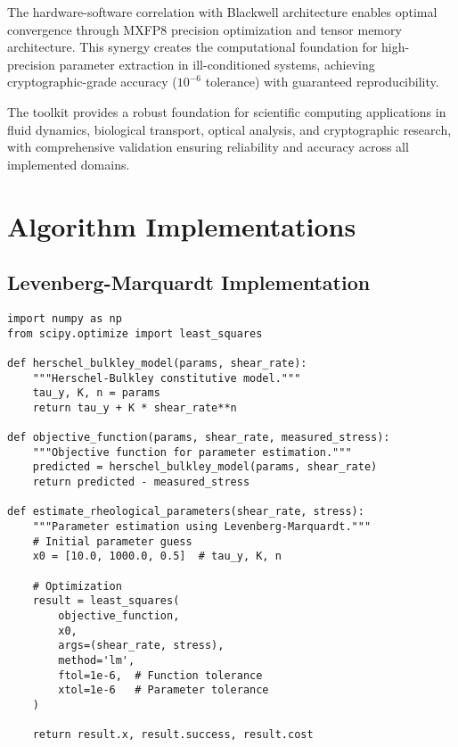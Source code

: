 \documentclass[11pt,a4paper]{article}
\begin{document}
The hardware-software correlation with Blackwell architecture enables optimal convergence through MXFP8 precision optimization and tensor memory architecture. This synergy creates the computational foundation for high-precision parameter extraction in ill-conditioned systems, achieving cryptographic-grade accuracy (\(10^{-6}\) tolerance) with guaranteed reproducibility.

The toolkit provides a robust foundation for scientific computing applications in fluid dynamics, biological transport, optical analysis, and cryptographic research, with comprehensive validation ensuring reliability and accuracy across all implemented domains.




\appendix

\section{Algorithm Implementations}

\subsection{Levenberg-Marquardt Implementation}

\begin{lstlisting}[caption=Levenberg-Marquardt Algorithm Implementation]
import numpy as np
from scipy.optimize import least_squares

def herschel_bulkley_model(params, shear_rate):
    """Herschel-Bulkley constitutive model."""
    tau_y, K, n = params
    return tau_y + K * shear_rate**n

def objective_function(params, shear_rate, measured_stress):
    """Objective function for parameter estimation."""
    predicted = herschel_bulkley_model(params, shear_rate)
    return predicted - measured_stress

def estimate_rheological_parameters(shear_rate, stress):
    """Parameter estimation using Levenberg-Marquardt."""
    # Initial parameter guess
    x0 = [10.0, 1000.0, 0.5]  # tau_y, K, n

    # Optimization
    result = least_squares(
        objective_function,
        x0,
        args=(shear_rate, stress),
        method='lm',
        ftol=1e-6,  # Function tolerance
        xtol=1e-6   # Parameter tolerance
    )

    return result.x, result.success, result.cost
\end{lstlisting}
\end{document}
